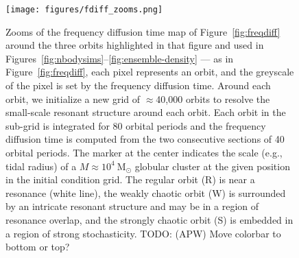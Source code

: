 \documentclass[letterpaper,12pt,preprint]{aastex}
\newcommand{\msun}{\ensuremath{\mathrm{M}_\odot}}
\newcommand{\todo}[2]{{\color{red} TODO: (\MakeUppercase{#1}) #2}}
\begin{document}
\clearpage
\begin{figure}[p]
\begin{center}
\texttt{[image: figures/fdiff\_zooms.png]}
\caption{Zooms of the frequency diffusion time map of Figure~\ref{fig:freqdiff} around the three orbits highlighted in that figure and used in Figures~\ref{fig:nbodysims}--\ref{fig:ensemble-density} --- as in Figure~\ref{fig:freqdiff}, each pixel represents an orbit, and the greyscale of the pixel is set by the frequency diffusion time. Around each orbit, we initialize a new grid of $\approx$40,000 orbits to resolve the small-scale resonant structure around each orbit. Each orbit in the sub-grid is integrated for 80 orbital periods and the frequency diffusion time is computed from the two consecutive sections of 40 orbital periods. The marker at the center indicates the scale (e.g., tidal radius) of a $M \approx 10^4~\msun$ globular cluster at the given position in the initial condition grid. The regular orbit (R) is near a resonance (white line), the weakly chaotic orbit (W) is surrounded by an intricate resonant structure and may be in a region of resonance overlap, and the strongly chaotic orbit (S) is embedded in a region of strong stochasticity. \todo{apw}{Move colorbar to bottom or top?}}
\label{fig:fdiff-zooms}
\end{center}
\end{figure}
\end{document}
